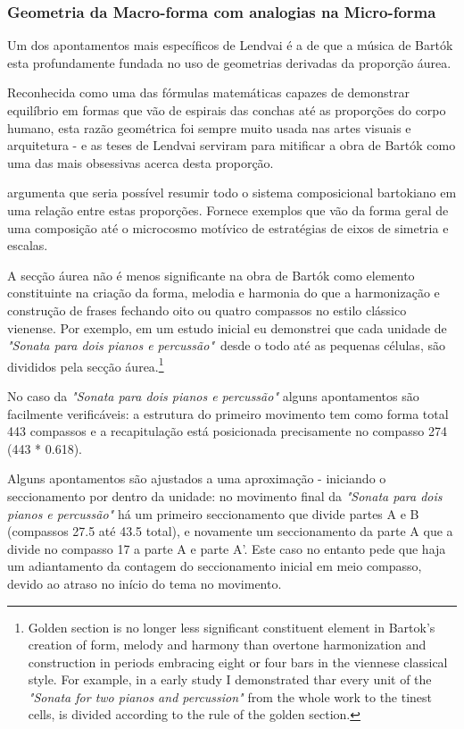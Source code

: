 \documentclass[
	12pt,				%
	openright,			%
	twoside,			%
	a4paper,			%
	english,			%
	french,				%
	spanish,			%
	brazil				%
	]{abntex2}
\begin{document}
\pagebreak
\subsubsection{Geometria da Macro-forma com analogias na Micro-forma}

Um dos apontamentos mais específicos de Lendvai é a de que a música de Bartók esta profundamente fundada no uso de geometrias derivadas da proporção áurea. 

Reconhecida como uma das fórmulas matemáticas capazes de demonstrar equilíbrio em formas que vão de espirais das conchas até as proporções do corpo humano, esta razão geométrica foi sempre muito usada nas artes visuais e arquitetura - e as teses de Lendvai serviram para mitificar a obra de Bartók como uma das mais obsessivas acerca desta proporção.

 argumenta que seria possível resumir todo o sistema composicional bartokiano em uma relação entre estas proporções. Fornece exemplos que vão da forma geral de uma composição até o microcosmo motívico de estratégias de eixos de simetria e escalas.


\begin{citacao}
A secção áurea não é menos significante na obra de Bartók como elemento constituinte na criação da forma, melodia e harmonia do que a harmonização e construção de frases fechando oito ou quatro compassos no estilo clássico vienense.
Por exemplo, em um estudo inicial eu demonstrei que cada unidade de \textit{"Sonata para dois pianos e percussão"}\ desde o todo até as pequenas células, são divididos pela secção áurea.\cite[p. 175]{lendvai1962duality}\footnote{
Golden section is no longer less significant constituent element in Bartok's creation of form, melody and harmony than overtone harmonization and construction in periods embracing eight or four bars in the viennese classical style. For example, in a early study I demonstrated thar every unit of the \textit{"Sonata for two pianos and percussion"} from the whole work to the tinest cells, is divided according to the rule of the golden section.\cite[p. 175]{lendvai1962duality}}
\end{citacao}

No caso da \textit{"Sonata para dois pianos e percussão"} alguns apontamentos são facilmente verificáveis: a estrutura do primeiro movimento tem como forma total 443 compassos e a recapitulação está posicionada precisamente no compasso 274 (443 * 0.618).

Alguns apontamentos são ajustados a uma aproximação - iniciando o seccionamento por dentro da unidade: no movimento final da \textit{"Sonata para dois pianos e percussão"} há um primeiro seccionamento que divide partes A e B (compassos 27.5 até 43.5 total), e novamente um seccionamento da parte A que a divide no compasso 17 a parte A e parte A'. Este caso no entanto pede que haja um adiantamento da contagem do seccionamento inicial em meio compasso, devido ao atraso no início do tema no movimento.
\end{document}
